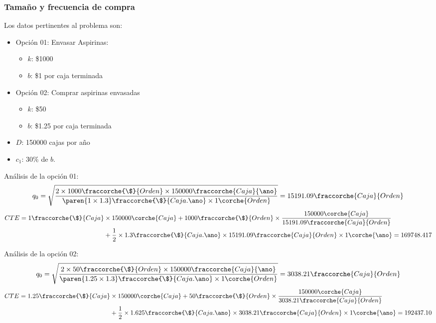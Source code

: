 \begin{homeworkProblem}
\subsubsection{Tamaño y frecuencia de compra}
Los datos pertinentes al problema son:
\begin{itemize}
    \item Opción 01: Envasar Aspirinas:
    \begin{itemize}
        \item $k$: \$1000
        \item $b$: \$1 por caja terminada
    \end{itemize}
    \item Opción 02: Comprar aspirinas envasadas
    \begin{itemize}
        \item $k$: \$50
        \item $b$: \$1.25 por caja terminada
    \end{itemize}
    \item $D$: 150000 cajas por año 
    \item $c_1$: 30\% de $b$.
\end{itemize}

Análisis de la opción 01:
\begin{align*}
    q_0=\sqrt{
        \frac{
            2\times 1000\fraccorche{\$}{Orden}\times 150000\fraccorche{Caja}{\ano}
            }{
                \paren{1 \times 1.3}\fraccorche{\$}{Caja.\ano}\times 1\corche{Orden}
            }
        }
        =
        15191.09\fraccorche{Caja}{Orden}
\end{align*}
\begin{align*}
    CTE = 1\fraccorche{\$}{Caja}&\times 150000\corche{Caja} + 1000\fraccorche{\$}{Orden}\times \frac{150000\corche{Caja}}{15191.09\fraccorche{Caja}{Orden}} \\&+ \frac{1}{2} \times 1.3\fraccorche{\$}{Caja.\ano} \times 15191.09\fraccorche{Caja}{Orden} \times 1\corche{\ano}=169748.417
\end{align*}

Análisis de la opción 02:
\begin{align*}
    q_0=\sqrt{
        \frac{
            2\times 50\fraccorche{\$}{Orden}\times 150000\fraccorche{Caja}{\ano}
            }{
                \paren{1.25 \times 1.3}\fraccorche{\$}{Caja.\ano}\times 1\corche{Orden}
            }
        }
        =
        3038.21\fraccorche{Caja}{Orden}
\end{align*}
\begin{align*}
    CTE = 1.25\fraccorche{\$}{Caja}&\times 150000\corche{Caja} + 50\fraccorche{\$}{Orden}\times \frac{150000\corche{Caja}}{3038.21\fraccorche{Caja}{Orden}} \\&+ \frac{1}{2} \times 1.625\fraccorche{\$}{Caja.\ano} \times 3038.21\fraccorche{Caja}{Orden} \times 1\corche{\ano}=192437.10
\end{align*}


\end{homeworkProblem}
